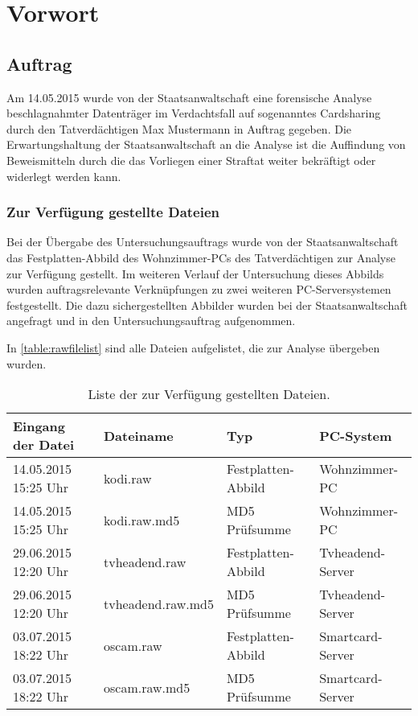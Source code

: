 \chapter{Vorwort}
\label{chap:prologue}

\section{Auftrag}
\label{sec:contract}
Am 14.05.2015 wurde von der Staatsanwaltschaft eine forensische Analyse beschlagnahmter Datenträger im Verdachtsfall auf sogenanntes Cardsharing durch den Tatverdächtigen Max Mustermann in Auftrag gegeben. Die Erwartungshaltung der Staatsanwaltschaft an die Analyse ist die Auffindung von Beweismitteln durch die das Vorliegen einer Straftat weiter bekräftigt oder widerlegt werden kann.

\subsection{Zur Verfügung gestellte Dateien}
\label{sec:contract-files}

Bei der Übergabe des Untersuchungsauftrags wurde von der Staatsanwaltschaft das Festplatten-Abbild des Wohnzimmer-PCs des Tatverdächtigen zur Analyse zur Verfügung gestellt. Im weiteren Verlauf der Untersuchung dieses Abbilds wurden auftragsrelevante Verknüpfungen zu zwei weiteren PC-Serversystemen festgestellt. Die dazu sichergestellten Abbilder wurden bei der Staatsanwaltschaft angefragt und in den Untersuchungsauftrag aufgenommen.

In \autoref{table:rawfilelist} sind alle Dateien aufgelistet, die zur Analyse übergeben wurden.

\begin{table}[h]
\begin{tabular}{llll}
\toprule
Eingang der Datei & Dateiname & Typ & PC-System \\ 
\midrule
14.05.2015 15:25 Uhr & kodi.raw & Festplatten-Abbild & Wohnzimmer-PC \\ 
14.05.2015 15:25 Uhr & kodi.raw.md5 & MD5 Prüfsumme & Wohnzimmer-PC \\ 
29.06.2015 12:20 Uhr & tvheadend.raw & Festplatten-Abbild & Tvheadend-Server \\ 
29.06.2015 12:20 Uhr & tvheadend.raw.md5 & MD5 Prüfsumme & Tvheadend-Server \\ 
03.07.2015 18:22 Uhr & oscam.raw & Festplatten-Abbild & Smartcard-Server \\ 
03.07.2015 18:22 Uhr & oscam.raw.md5 & MD5 Prüfsumme & Smartcard-Server \\ 
\bottomrule
\end{tabular} 
\caption{Liste der zur Verfügung gestellten Dateien.}
\label{table:rawfilelist}
\end{table}


